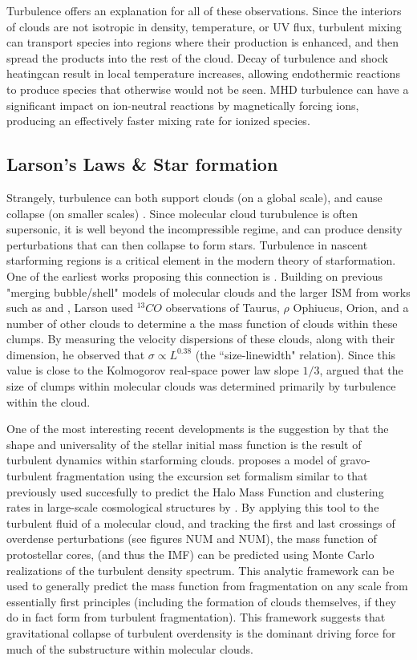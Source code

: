 \documentclass[12pt, preprint]{aastex}
\begin{document}
Turbulence offers an explanation for all of these observations.  Since the
interiors of clouds are not isotropic in density, temperature, or UV flux,
turbulent mixing can transport species into regions where their production is
enhanced, and then spread the products into the rest of the cloud.  Decay of
turbulence and shock heatingcan result in local temperature increases, allowing 
endothermic reactions to produce species that otherwise would not be 
seen\citep{xie1995}.  MHD turbulence
can have a significant impact on ion-neutral reactions by magnetically forcing
ions, producing an effectively faster mixing rate for ionized species.
\subsection{Larson's Laws \& Star formation}
Strangely, turbulence can both support clouds (on a global scale), and cause
collapse (on smaller scales) \citep{mac2004}.  Since molecular cloud
turubulence is often supersonic, it is well beyond the incompressible regime,
and can produce density perturbations that can then collapse to form
stars\citep{elm2004}. Turbulence in nascent starforming 
regions is a critical element in the modern theory 
of starformation. One of the earliest works proposing this connection is
\citet{larson1981}.  Building on previous "merging bubble/shell" models of
molecular clouds and the larger ISM from works such as \citet{norman1980} and
\citet{mckee1977}, Larson used $^{13}CO$ observations of Taurus, $\rho$
Ophiucus, Orion, and a number of other clouds to determine a the mass function
of clouds within these clumps.  By measuring the velocity dispersions of these
clouds, along with their dimension, he observed that $\sigma \propto L^{0.38}$
(the ``size-linewidth" relation).  Since this value is close to the Kolmogorov
real-space power law slope $1/3$, \citet{larson1981} argued that the size of
clumps within molecular clouds was determined primarily by turbulence within
the cloud.

One of the most interesting recent developments is the suggestion by
\citet{hopk2013} that the
shape and universality of the stellar initial mass function is the result of 
turbulent dynamics within
starforming clouds. \citet{hopk2013} proposes a model of gravo-turbulent
fragmentation using the excursion set formalism similar to that previously used 
succesfully to predict the Halo Mass Function and clustering rates in
large-scale cosmological structures by \citet{press1974}.  By applying this tool
to the turbulent fluid of a molecular cloud, and tracking the first and last
crossings of overdense perturbations (see figures NUM and NUM), the mass function of
protostellar cores, (and thus the IMF) can be predicted using Monte Carlo
realizations of the turbulent density spectrum.  This analytic framework
can be used to generally predict the mass function from fragmentation
on any scale from essentially first principles (including the formation 
of clouds themselves, if they do in fact
form from turbulent fragmentation).  This framework suggests that gravitational
collapse of turbulent overdensity is the dominant driving force for much of the
substructure within molecular clouds.
\end{document}
